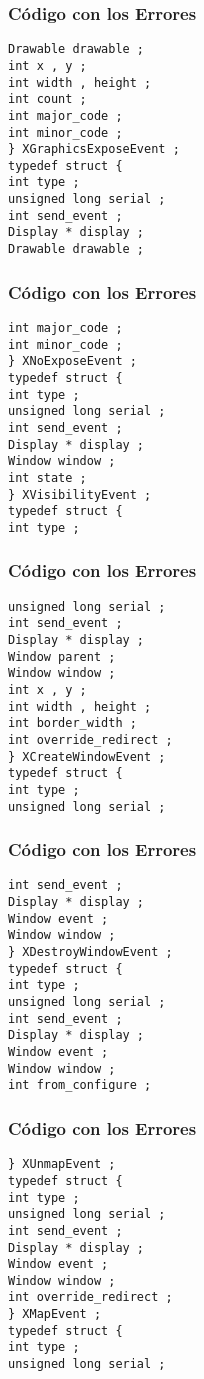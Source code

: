 \documentclass{beamer}
\begin{document}
\begin{frame}[fragile]
\frametitle{C\'odigo con los Errores}
\begin{verbatim}
Drawable drawable ; 
int x , y ; 
int width , height ; 
int count ; 
int major_code ; 
int minor_code ; 
} XGraphicsExposeEvent ; 
typedef struct { 
int type ; 
unsigned long serial ; 
int send_event ; 
Display * display ; 
Drawable drawable ; 
\end{verbatim}
\end{frame}
\begin{frame}[fragile]
\frametitle{C\'odigo con los Errores}
\begin{verbatim}
int major_code ; 
int minor_code ; 
} XNoExposeEvent ; 
typedef struct { 
int type ; 
unsigned long serial ; 
int send_event ; 
Display * display ; 
Window window ; 
int state ; 
} XVisibilityEvent ; 
typedef struct { 
int type ; 
\end{verbatim}
\end{frame}
\begin{frame}[fragile]
\frametitle{C\'odigo con los Errores}
\begin{verbatim}
unsigned long serial ; 
int send_event ; 
Display * display ; 
Window parent ; 
Window window ; 
int x , y ; 
int width , height ; 
int border_width ; 
int override_redirect ; 
} XCreateWindowEvent ; 
typedef struct { 
int type ; 
unsigned long serial ; 
\end{verbatim}
\end{frame}
\begin{frame}[fragile]
\frametitle{C\'odigo con los Errores}
\begin{verbatim}
int send_event ; 
Display * display ; 
Window event ; 
Window window ; 
} XDestroyWindowEvent ; 
typedef struct { 
int type ; 
unsigned long serial ; 
int send_event ; 
Display * display ; 
Window event ; 
Window window ; 
int from_configure ; 
\end{verbatim}
\end{frame}
\begin{frame}[fragile]
\frametitle{C\'odigo con los Errores}
\begin{verbatim}
} XUnmapEvent ; 
typedef struct { 
int type ; 
unsigned long serial ; 
int send_event ; 
Display * display ; 
Window event ; 
Window window ; 
int override_redirect ; 
} XMapEvent ; 
typedef struct { 
int type ; 
unsigned long serial ; 
\end{verbatim}
\end{frame}
\end{document}
